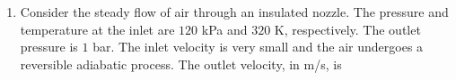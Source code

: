 \documentclass[a4paper,10pt]{article}
\begin{document}
\begin{enumerate}
    \hfill{}
    \begin{enumerate}
    \end{enumerate}

    \item Consider the steady flow of air through an insulated nozzle. The pressure and temperature at the inlet are $120$ kPa and $320$ K, respectively. The outlet pressure is $1$ bar. The inlet velocity is very small and the air undergoes a reversible adiabatic process. The outlet velocity, in m/s, is
    
    \hfill{}
    \begin{enumerate}
    \end{enumerate}
\end{enumerate}
\clearpage
\end{document}

